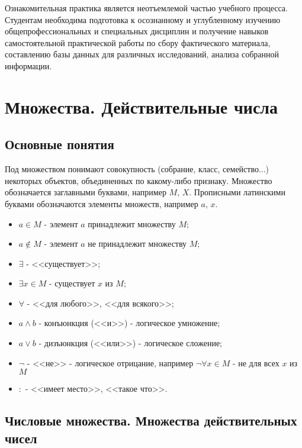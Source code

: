 \documentclass[14pt]{extreport}
\begin{document}



\tableofcontents

\intro

Ознакомительная практика является неотъемлемой частью учебного процесса. Студентам необходима подготовка к осознанному и углубленному изучению общепрофессиональных и специальных дисциплин и получение навыков самостоятельной практической работы по сбору фактического материала, составлению базы данных для различных исследований, анализа собранной информации.




\chapter{Множества. Действительные числа}

\section{Основные понятия}

Под множеством понимают совокупность (собрание, класс, семейство...) некоторых объектов, объединенных по какому-либо признаку.
Множество обозначается заглавными буквами, например $M$, $X$. Прописными латинскими буквами обозначаются элементы множеств, например $a$, $x$.
\begin{itemize}
\item $a \in M$ - элемент $a$ принадлежит множеству $M$;
\item $a \notin M$ - элемент $a$ не принадлежит множеству $M$;
\item $\exists$ - <<существует>>;
\item $\exists x \in M$ - существует $x$ из $M$;
\item $\forall$ - <<для любого>>, <<для всякого>>;
\item $a \wedge b$ - конъюнкция (<<и>>) - логическое умножение;
\item $a \vee b$  - дизъюнкция (<<или>>) - логическое сложение;
\item $\neg$ - <<не>> - логическое отрицание, например $\neg \forall x \in M$ - не для всех $x$ из $M$
\item $:$ - <<имеет место>>, <<такое что>>.
\end{itemize}



\section{Числовые множества. Множества действительных чисел}
\end{document}
